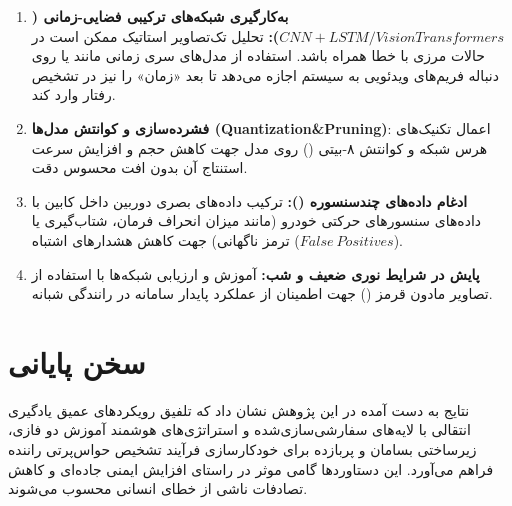 \documentclass{report}
\begin{document}
 			\begin{enumerate}
 				\item \textbf{به‌کارگیری شبکه‌های ترکیبی فضایی-زمانی ($CNN + LSTM / Vision Transformers$):}
 				تحلیل تک‌تصاویر استاتیک ممکن است در حالات مرزی با خطا همراه باشد. استفاده از مدل‌های سری زمانی مانند  یا  روی دنباله فریم‌های ویدئویی به سیستم اجازه می‌دهد تا بعد «زمان» را نیز در تشخیص رفتار وارد کند.
 				
 				\item \textbf{فشرده‌سازی و کوانتش مدل‌ها (Quantization\&Pruning)}:
 				اعمال تکنیک‌های هرس شبکه و کوانتش ۸-بیتی () روی مدل  جهت کاهش حجم و افزایش سرعت استنتاج آن بدون افت محسوس دقت.
 				
 				\item \textbf{ادغام داده‌های چندسنسوره ():}
 				ترکیب داده‌های بصری دوربین داخل کابین با داده‌های سنسورهای حرکتی خودرو (مانند میزان انحراف فرمان، شتاب‌گیری یا ترمز ناگهانی) جهت کاهش هشدارهای اشتباه ($False~Positives$).
 				
 				\item \textbf{پایش در شرایط نوری ضعیف و شب:}
 				آموزش و ارزیابی شبکه‌ها با استفاده از تصاویر مادون قرمز () جهت اطمینان از عملکرد پایدار سامانه در رانندگی شبانه.
 			\end{enumerate}
 			
 			\section{سخن پایانی}
 			نتایج به دست آمده در این پژوهش نشان داد که تلفیق رویکردهای عمیق یادگیری انتقالی با لایه‌های سفارشی‌سازی‌شده و استراتژی‌های هوشمند آموزش دو فازی، زیرساختی بسامان و پربازده برای خودکارسازی فرآیند تشخیص حواس‌پرتی راننده فراهم می‌آورد. این دستاوردها گامی موثر در راستای افزایش ایمنی جاده‌ای و کاهش تصادفات ناشی از خطای انسانی محسوب می‌شوند.
 	
 	
 	
 
\end{document}
